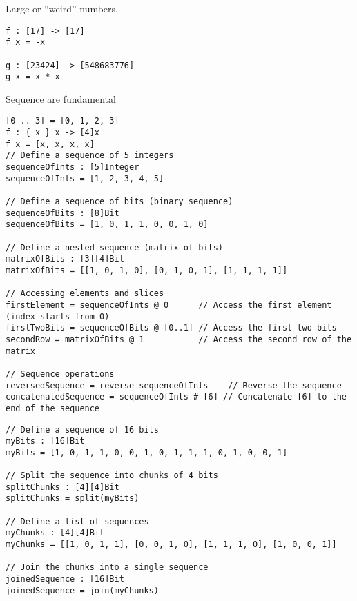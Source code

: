 Large or ``weird'' numbers.
\begin{lstlisting}[style=haskell]
f : [17] -> [17]
f x = -x

g : [23424] -> [548683776]
g x = x * x
\end{lstlisting}

Sequence are fundamental
\begin{lstlisting}[style=haskell]
[0 .. 3] = [0, 1, 2, 3]
f : { x } x -> [4]x
f x = [x, x, x, x]
// Define a sequence of 5 integers
sequenceOfInts : [5]Integer
sequenceOfInts = [1, 2, 3, 4, 5]

// Define a sequence of bits (binary sequence)
sequenceOfBits : [8]Bit
sequenceOfBits = [1, 0, 1, 1, 0, 0, 1, 0]

// Define a nested sequence (matrix of bits)
matrixOfBits : [3][4]Bit
matrixOfBits = [[1, 0, 1, 0], [0, 1, 0, 1], [1, 1, 1, 1]]

// Accessing elements and slices
firstElement = sequenceOfInts @ 0      // Access the first element (index starts from 0)
firstTwoBits = sequenceOfBits @ [0..1] // Access the first two bits
secondRow = matrixOfBits @ 1           // Access the second row of the matrix

// Sequence operations
reversedSequence = reverse sequenceOfInts    // Reverse the sequence
concatenatedSequence = sequenceOfInts # [6] // Concatenate [6] to the end of the sequence
\end{lstlisting}

\newpage
\begin{lstlisting}[style=haskell]
// Define a sequence of 16 bits
myBits : [16]Bit
myBits = [1, 0, 1, 1, 0, 0, 1, 0, 1, 1, 1, 0, 1, 0, 0, 1]

// Split the sequence into chunks of 4 bits
splitChunks : [4][4]Bit
splitChunks = split(myBits)

// Define a list of sequences
myChunks : [4][4]Bit
myChunks = [[1, 0, 1, 1], [0, 0, 1, 0], [1, 1, 1, 0], [1, 0, 0, 1]]

// Join the chunks into a single sequence
joinedSequence : [16]Bit
joinedSequence = join(myChunks)
\end{lstlisting}

